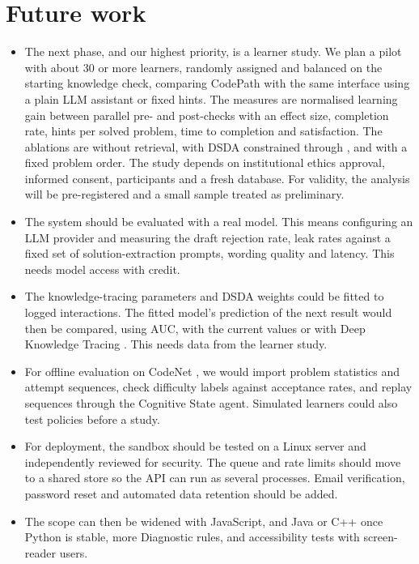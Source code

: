 \section{Future work}
\begin{itemize}
\item The next phase, and our highest priority, is a learner study. We plan a pilot with about 30 or more learners, randomly assigned and balanced on the starting knowledge check, comparing CodePath with the same interface using a plain LLM assistant or fixed hints. The measures are normalised learning gain between parallel pre- and post-checks with an effect size, completion rate, hints per solved problem, time to completion and satisfaction. The ablations are without retrieval, with DSDA constrained through , and with a fixed problem order. The study depends on institutional ethics approval, informed consent, participants and a fresh database. For validity, the analysis will be pre-registered and a small sample treated as preliminary.
\item The system should be evaluated with a real model. This means configuring an LLM provider and measuring the draft rejection rate, leak rates against a fixed set of solution-extraction prompts, wording quality and latency. This needs model access with credit.
\item The knowledge-tracing parameters and DSDA weights could be fitted to logged interactions. The fitted model's prediction of the next result would then be compared, using AUC, with the current values or with Deep Knowledge Tracing \cite{piech2015}. This needs data from the learner study.
\item For offline evaluation on CodeNet \cite{puri2021}, we would import problem statistics and attempt sequences, check difficulty labels against acceptance rates, and replay sequences through the Cognitive State agent. Simulated learners \cite{zhan2025} could also test policies before a study.
\item For deployment, the sandbox should be tested on a Linux server and independently reviewed for security. The queue and rate limits should move to a shared store so the API can run as several processes. Email verification, password reset and automated data retention should be added.
\item The scope can then be widened with JavaScript, and Java or C++ once Python is stable, more Diagnostic rules, and accessibility tests with screen-reader users.
\end{itemize}
